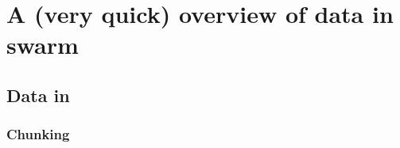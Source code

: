 
\section[Files and Chunks]{A (very quick) overview of data in swarm}



\subsection{Data in}
\subsubsection{Chunking}

